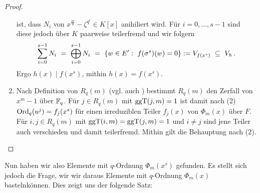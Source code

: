 \begin{proof}
\begin{enumerate}
      ist, dass $N_i$ von $x^{\frac m b}-\zeta^{q^i} \in K[x]$ anihiliert wird.
      Für $i=0,\ldots,s-1$ sind diese jedoch über $K$ paarweise teilerfremd
      und wir folgern
      \[ \sum_{i=0}^{s-1} N_i \ =\  \bigoplus_{i=0}^{s-1} N_i 
        \ =\  \{ w \in E':\ f(\sigma^s)(w) = 0 \} := V_{f(x^s)} 
        \ \subseteq\  V_h\,.\]
      Ergo $h(x) \mid f(x^s)$, mithin $h(x) = f(x^s)$.
    \item Nach Definition von $R_q(m)$ (vgl. auch 
      ) bestimmt $R_q(m)$ den Zerfall
      von $x^m-1$ über $\mathbb{F}_q$. Für $j\in R_q(m)$ mit $\operatorname{ggT}(j,m) = 1$ 
      ist damit nach (2) $\operatorname{Ord}_q(u^j) = f_j(x^s)$ für einen irreduziblen Teiler
      $f_j(x)$ von $\Phi_m(x)$ über $F$. Für $i,j\in R_q(m)$ mit 
      $\operatorname{ggT}(i,m) = \operatorname{ggT}(j,m) = 1$ und $i\neq j$ sind jene Teiler auch
      verschieden und damit teilerfremd. Mithin gilt die Behauptung
      nach  (2).
  \end{enumerate}
\end{proof}

Nun haben wir also Elemente mit $q$-Ordnung $\Phi_m(x^s)$ gefunden. Es stellt
sich jedoch die Frage, wir wir daraus Elemente mit $q$-Ordnung $\Phi_m(x)$ 
\glqq basteln\grqq können. Dies zeigt uns der folgende Satz:

